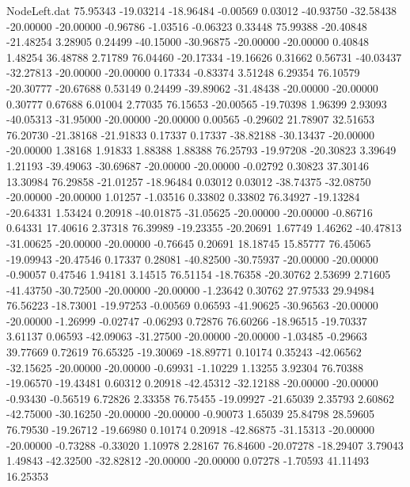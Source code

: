 \begin{filecontents}{NodeLeft.dat}
  75.95343  -19.03214  -18.96484    -0.00569    0.03012  -40.93750  -32.58438  -20.00000  -20.00000   -0.96786   -1.03516   -0.06323    0.33448
  75.99388  -20.40848  -21.48254     3.28905    0.24499  -40.15000  -30.96875  -20.00000  -20.00000    0.40848    1.48254   36.48788    2.71789
  76.04460  -20.17334  -19.16626     0.31662    0.56731  -40.03437  -32.27813  -20.00000  -20.00000    0.17334   -0.83374    3.51248    6.29354
  76.10579  -20.30777  -20.67688     0.53149    0.24499  -39.89062  -31.48438  -20.00000  -20.00000    0.30777    0.67688    6.01004    2.77035
  76.15653  -20.00565  -19.70398     1.96399    2.93093  -40.05313  -31.95000  -20.00000  -20.00000    0.00565   -0.29602   21.78907   32.51653
  76.20730  -21.38168  -21.91833     0.17337    0.17337  -38.82188  -30.13437  -20.00000  -20.00000    1.38168    1.91833    1.88388    1.88388
  76.25793  -19.97208  -20.30823     3.39649    1.21193  -39.49063  -30.69687  -20.00000  -20.00000   -0.02792    0.30823   37.30146   13.30984
  76.29858  -21.01257  -18.96484     0.03012    0.03012  -38.74375  -32.08750  -20.00000  -20.00000    1.01257   -1.03516    0.33802    0.33802
  76.34927  -19.13284  -20.64331     1.53424    0.20918  -40.01875  -31.05625  -20.00000  -20.00000   -0.86716    0.64331   17.40616    2.37318
  76.39989  -19.23355  -20.20691     1.67749    1.46262  -40.47813  -31.00625  -20.00000  -20.00000   -0.76645    0.20691   18.18745   15.85777
  76.45065  -19.09943  -20.47546     0.17337    0.28081  -40.82500  -30.75937  -20.00000  -20.00000   -0.90057    0.47546    1.94181    3.14515
  76.51154  -18.76358  -20.30762     2.53699    2.71605  -41.43750  -30.72500  -20.00000  -20.00000   -1.23642    0.30762   27.97533   29.94984
  76.56223  -18.73001  -19.97253    -0.00569    0.06593  -41.90625  -30.96563  -20.00000  -20.00000   -1.26999   -0.02747   -0.06293    0.72876
  76.60266  -18.96515  -19.70337     3.61137    0.06593  -42.09063  -31.27500  -20.00000  -20.00000   -1.03485   -0.29663   39.77669    0.72619
  76.65325  -19.30069  -18.89771     0.10174    0.35243  -42.06562  -32.15625  -20.00000  -20.00000   -0.69931   -1.10229    1.13255    3.92304
  76.70388  -19.06570  -19.43481     0.60312    0.20918  -42.45312  -32.12188  -20.00000  -20.00000   -0.93430   -0.56519    6.72826    2.33358
  76.75455  -19.09927  -21.65039     2.35793    2.60862  -42.75000  -30.16250  -20.00000  -20.00000   -0.90073    1.65039   25.84798   28.59605
  76.79530  -19.26712  -19.66980     0.10174    0.20918  -42.86875  -31.15313  -20.00000  -20.00000   -0.73288   -0.33020    1.10978    2.28167
  76.84600  -20.07278  -18.29407     3.79043    1.49843  -42.32500  -32.82812  -20.00000  -20.00000    0.07278   -1.70593   41.11493   16.25353

\end{filecontents}
